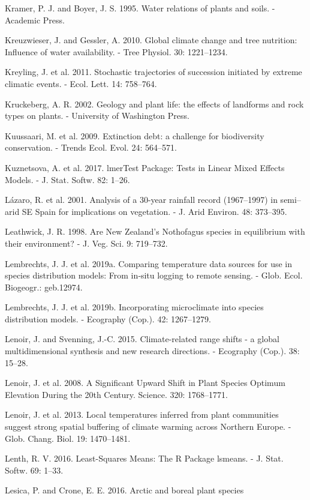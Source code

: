 \documentclass[11pt,twoside]{reedthesis}
\begin{document}
Kramer, P. J. and Boyer, J. S. 1995. Water relations of plants and
soils. - Academic Press.\par
Kreuzwieser, J. and Gessler, A. 2010. Global climate change and tree
nutrition: Influence of water availability. - Tree Physiol. 30:
1221--1234.\par
Kreyling, J. et al. 2011. Stochastic trajectories of succession
initiated by extreme climatic events. - Ecol. Lett. 14: 758--764.\par
Kruckeberg, A. R. 2002. Geology and plant life: the effects of landforms
and rock types on plants. - University of Washington Press.\par
Kuussaari, M. et al. 2009. Extinction debt: a challenge for biodiversity
conservation. - Trends Ecol. Evol. 24: 564--571.\par
Kuznetsova, A. et al. 2017. lmerTest Package: Tests in Linear Mixed
Effects Models. - J. Stat. Softw. 82: 1--26.\par
Lázaro, R. et al. 2001. Analysis of a 30-year rainfall record
(1967--1997) in semi--arid SE Spain for implications on vegetation. - J.
Arid Environ. 48: 373--395.\par
Leathwick, J. R. 1998. Are New Zealand's Nothofagus species in
equilibrium with their environment? - J. Veg. Sci. 9: 719--732.\par
Lembrechts, J. J. et al. 2019a. Comparing temperature data sources for
use in species distribution models: From in‐situ logging to remote
sensing. - Glob. Ecol. Biogeogr.: geb.12974.\par
Lembrechts, J. J. et al. 2019b. Incorporating microclimate into species
distribution models. - Ecography (Cop.). 42: 1267--1279.\par
Lenoir, J. and Svenning, J.-C. 2015. Climate-related range shifts - a
global multidimensional synthesis and new research directions. -
Ecography (Cop.). 38: 15--28.\par
Lenoir, J. et al. 2008. A Significant Upward Shift in Plant Species
Optimum Elevation During the 20th Century. Science. 320: 1768--1771.\par
Lenoir, J. et al. 2013. Local temperatures inferred from plant
communities suggest strong spatial buffering of climate warming across
Northern Europe. - Glob. Chang. Biol. 19: 1470--1481.\par
Lenth, R. V. 2016. Least-Squares Means: The R Package lsmeans. - J.
Stat. Softw. 69: 1--33.\par
Lesica, P. and Crone, E. E. 2016. Arctic and boreal plant species
\end{document}
